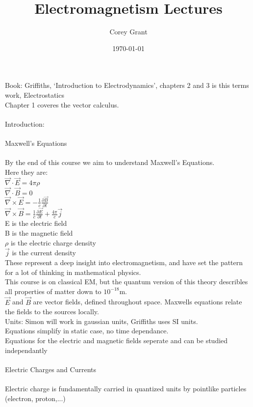 \documentclass[a4paper,11pt]{article}
\title{Electromagnetism Lectures}
\author{Corey Grant}
\date{\today}
\begin{document}
\maketitle

Book: Griffiths, `Introduction to Electrodynamics', chapters 2 and 3 is this terms work, Electrostatics\\
Chapter 1 coveres the vector calculus.\\
\\
Introduction:\\
\\
Maxwell's Equations\\
\\
By the end of this course we aim to understand Maxwell's Equations.\\
Here they are:\\
$\vec{\nabla} \cdot \vec{E} = 4\pi \rho $\\
$\vec{\nabla} \cdot \vec{B} = 0$\\
$\vec{\nabla} \times \vec{E} = -\frac{1}{c} \frac{\partial \vec{B}}{\partial t}$\\
$\vec{\nabla} \times \vec{B} = \frac{1}{c} \frac{\partial \vec{E}}{\partial t} + \frac{4 \pi}{c} \vec{j}$\\
E is the electric field\\
B is the magnetic field\\
$\rho$ is the electric charge density\\
$\vec{j}$ is the current density\\
These represent a deep insight into electromagnetism, and have set the pattern for a lot of thinking in mathematical physics.\\
This course is on classical EM, but the quantum version of this theory describles all properties of matter down to $10^{-18}$m.\\
$\vec{E}$ and $\vec{B}$ are vector fields, defined throughout space. Maxwells equations relate the fields to the sources locally.\\
Units: Simon will work in gaussian units, Griffiths uses SI units.\\
Equations simplify in static case, no time dependance.\\
Equations for the electric and magnetic fields seperate and can be studied independantly\\
\\
Electric Charges and Currents\\
\\
Electric charge is fundamentally carried in quantized units by pointlike particles (electron, proton,...)\\
\end{document}
